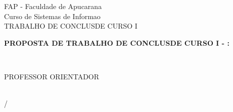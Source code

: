 \begin{titlepage}
  \begin{center}
    FAP - Faculdade de Apucarana\\
    Curso de Sistemas de Informa\ca o\\
    TRABALHO DE CONCLUS\AO DE CURSO I\\
    \vfill
    
    \textbf{PROPOSTA DE TRABALHO DE CONCLUS\AO DE CURSO I - \NOME: \ASSUNTO}\\
    \vfill

    \AUTOR\\
    \vfill

    PROFESSOR ORIENTADOR\\
    \ORIENTADOR\\
    \vfill

    \begin{espacosimples}
      {\LOCAL}/{\DATA}
    \end{espacosimples}
  \end{center}
\end{titlepage}
